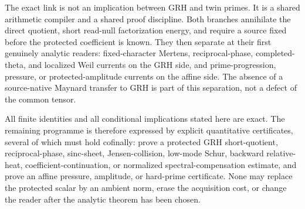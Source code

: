 \documentclass[11pt]{article}
\theoremstyle{definition}
\theoremstyle{remark}
\begin{document}
The exact link is not an implication between GRH and twin primes.  It is a
shared arithmetic compiler and a shared proof discipline.  Both branches
annihilate the direct quotient, short read-null factorization energy, and
require a source fixed before the protected coefficient is known.  They then
separate at their first genuinely analytic readers: fixed-character Mertens,
reciprocal-phase, completed-theta, and localized Weil currents on the GRH
side, and prime-progression, pressure, or protected-amplitude currents on the
affine side.  The absence of a
source-native Maynard transfer to GRH is part of this separation, not a defect
of the common tensor.

All finite identities and all conditional implications stated here are exact.
The remaining programme is therefore expressed by explicit quantitative
certificates, several of which must hold cofinally: prove a protected GRH
short-quotient, reciprocal-phase, sinc-sheet, Jensen-collision, low-mode
Schur, backward relative-heat, coefficient-continuation, or normalized
spectral-compensation estimate, and prove an affine pressure, amplitude,
or hard-prime certificate.  None may
replace the protected scalar by an ambient norm, erase the acquisition cost,
or change the reader after the analytic theorem has been chosen.
\end{document}
